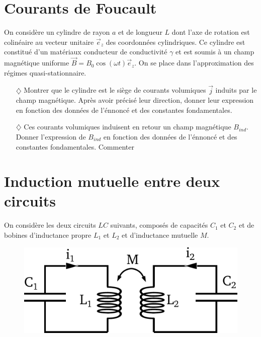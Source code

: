 \documentclass{report}
\begin{document}
\section*{Courants de Foucault}

On considère un cylindre de rayon $a$ et de longueur $L$ dont l'axe de rotation est colinéaire au vecteur unitaire $\vec{e}_z$ des coordonnées cylindriques. Ce cylindre est constitué d'un matériaux conducteur de conductivité $\gamma$ et est soumis à un champ magnétique uniforme $\vec{B}=B_0\cos(\omega t)\vec{e}_z$. On se place dans l'approximation des régimes quasi-stationnaire.

\begin{itemize}

	\item[$\diamondsuit$] Montrer que le cylindre est le siège de courants volumiques $\vec{j}$ induits par le champ magnétique. Après avoir précisé leur direction, donner leur expression en fonction des données de l'énnoncé et des constantes fondamentales.
	
	\item[$\diamondsuit$] Ces courants volumiques induisent en retour un champ magnétique $B_{ind}$. Donner l'expression de $B_{ind}$ en fonction des données de l'énnoncé et des constantes fondamentales. Commenter

\end{itemize}

\newpage

\section*{Induction mutuelle entre deux circuits}
On considère les deux circuits $LC$ suivants, composés de capacités $C_1$ et $C_2$ et de bobines d'inductance propre $L_1$ et $L_2$ et d'inductance mutuelle $M$. 

\begin{figure}[h!]
\centering
		\includegraphics[scale=0.45]{induction_mutuelle.pdf}
\end{figure}
\end{document}
